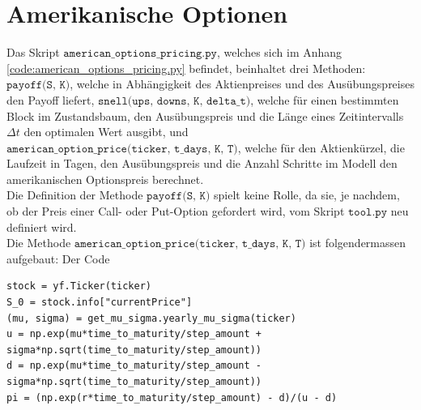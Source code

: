 \documentclass[11pt]{report} %
\begin{document}
\section{Amerikanische Optionen}
Das Skript $\texttt{american\_options\_pricing.py}$, welches sich im Anhang \ref{code:american_options_pricing.py} befindet, beinhaltet drei Methoden: $\texttt{payoff(S, K)}$, welche in Abhängigkeit des Aktienpreises und des Ausübungspreises den Payoff liefert, $\texttt{snell(ups, downs, K, delta\_t)}$, welche für einen bestimmten Block im Zustandsbaum, den Ausübungspreis und die Länge eines Zeitintervalls $\Delta t$ den optimalen Wert ausgibt, und $\texttt{american\_option\_price(ticker, t\_days, K, T)}$, welche für den Aktienkürzel, die Laufzeit in Tagen, den Ausübungspreis und die Anzahl Schritte im Modell den amerikanischen Optionspreis berechnet.\\
Die Definition der Methode $\texttt{payoff(S, K)}$ spielt keine Rolle, da sie, je nachdem, ob der Preis einer Call- oder Put-Option gefordert wird, vom Skript $\texttt{tool.py}$ neu definiert wird.\\
Die Methode $\texttt{american\_option\_price(ticker, t\_days, K, T)}$ ist folgendermassen aufgebaut: Der Code\begin{lstlisting}
stock = yf.Ticker(ticker)
S_0 = stock.info["currentPrice"]
(mu, sigma) = get_mu_sigma.yearly_mu_sigma(ticker)
u = np.exp(mu*time_to_maturity/step_amount + sigma*np.sqrt(time_to_maturity/step_amount))
d = np.exp(mu*time_to_maturity/step_amount - sigma*np.sqrt(time_to_maturity/step_amount))
pi = (np.exp(r*time_to_maturity/step_amount) - d)/(u - d)
\end{lstlisting}
\end{document}
